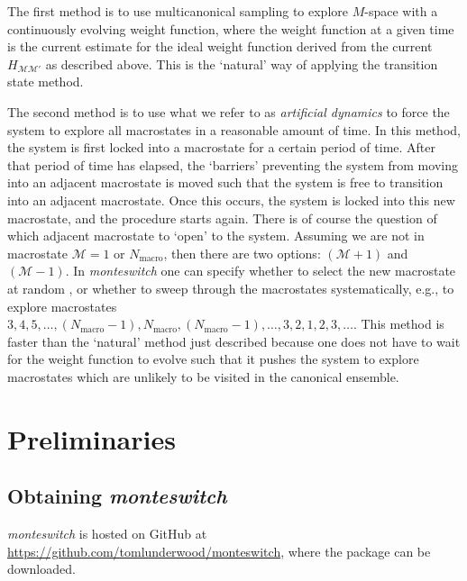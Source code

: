 \documentclass{report}
\begin{document}
The first method is to use multicanonical sampling to explore $M$-space with a continuously evolving weight function, where the weight function
at a given time is the current estimate for the ideal weight function derived from the current $H_{\mathcal{M}\mathcal{M}'}$ as described above.
This is the `natural' way of applying the transition state method.

The second method is to use what we refer to as \emph{artificial dynamics} to force the system to explore all macrostates in a reasonable amount of time. 
In this method, the system is first locked into a macrostate for a certain period of time. After that period of time has elapsed, the `barriers' preventing
the system from moving into an adjacent macrostate is moved such that the system is free to transition into an adjacent macrostate. Once this occurs,
the system is locked into this new macrostate, and the procedure starts again. There is of course the question of which adjacent macrostate to `open'
to the system. Assuming we are not in macrostate $\mathcal{M}=1$ or $N_{\text{macro}}$, then there are two options: $(\mathcal{M}+1)$ and $(\mathcal{M}-1)$.
In \emph{monteswitch} one can specify whether to select the new macrostate at random \cite{thesis:Jackson}, 
or whether to sweep through the macrostates systematically, e.g., to explore macrostates 
$3,4,5,\dotsc,(N_{\text{macro}}-1),N_{\text{macro}},(N_{\text{macro}}-1),\dotsc,3,2,1,2,3,\dotsc$. This method is faster than the `natural'
method just described because one does not have to wait for the weight function to evolve such that it pushes the system to explore macrostates which
are unlikely to be visited in the canonical ensemble.




\chapter{Preliminaries}\label{chapter:preliminaries}

\section{Obtaining \emph{monteswitch}}
\emph{monteswitch} is hosted on GitHub at \url{https://github.com/tomlunderwood/monteswitch}, where the package can be downloaded.
\end{document}
